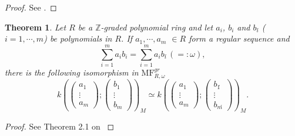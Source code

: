 \documentclass[10pt]{amsart}
\theoremstyle{break}
\newtheorem{thm}[de]{Theorem}
\begin{document}
\begin{proof}
See \cite{Ras}\cite{Wu}.
\end{proof}
\begin{thm}\label{reg-eq}
Let $R$ be a ${{\mathbb{Z}}}$-graded polynomial ring and let $a_i$, $b_i$ and $b_i\acute{}$ ($i=1,\cdots ,m$) be polynomials in $R$.
If $a_1,\cdots ,a_m$ $\in R$ form a regular sequence and
\begin{equation*}
\sum_{i=1}^m a_ib_i=\sum_{i=1}^m a_ib_i\acute{} \,(=:\omega),
\end{equation*}
there is the following isomorphism in ${{\mathrm{MF}}}^{gr}_{R,\omega}$
\begin{equation*}
k\left(
\left(
\begin{array}{c}
a_1\\
\vdots\\
a_m
\end{array}
\right);
\left(
\begin{array}{c}
b_1\\
\vdots\\
b_m
\end{array}
\right)
\right)_M
\simeq
k\left(
\left(
\begin{array}{c}
a_1\\
\vdots\\
a_m
\end{array}
\right);
\left(
\begin{array}{c}
b_1\acute{}\\
\vdots\\
b_m\acute{}
\end{array}
\right)
\right)_M.
\end{equation*}
\end{thm}
\begin{proof}
See Theorem 2.1 on \cite{KR3}
\end{proof}
\end{document}
